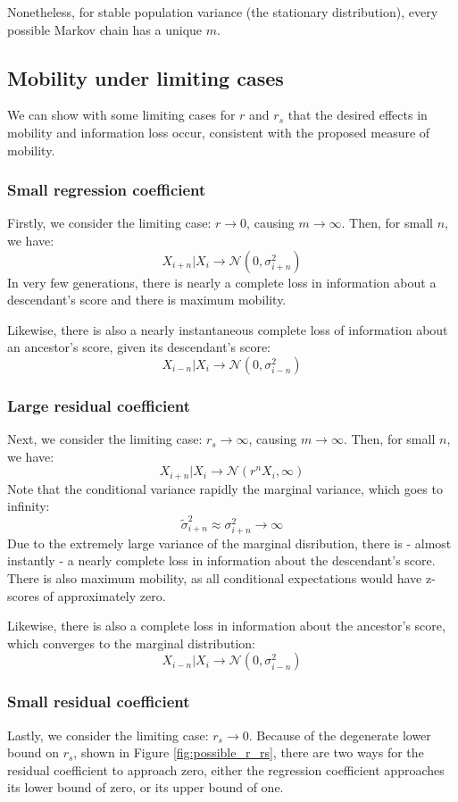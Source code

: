 \documentclass[letterpaper,10pt]{article} %
\begin{document}
Nonetheless, for stable population variance (the stationary distribution), every possible Markov chain has a unique $m$. 

\subsection{Mobility under limiting cases}

We can show with some limiting cases for $r$ and $r_s$ that the desired effects in mobility and information loss occur, consistent with the proposed measure of mobility. 

\subsubsection*{Small regression coefficient}
Firstly, we consider the limiting case: $r \rightarrow 0$, causing $m \rightarrow \infty$. Then, for small $n$, we have:
$$X_{i+n}|X_i \rightarrow \mathcal{N}(0, \sigma_{i+n}^2)$$
In very few generations, there is nearly a complete loss in information about a descendant's score and there is maximum mobility. 

Likewise, there is also a nearly instantaneous complete loss of information about an ancestor's score, given its descendant's score:
$$X_{i-n}|X_i \rightarrow \mathcal{N}(0, \sigma_{i-n}^2)$$


\subsubsection*{Large residual coefficient}
Next, we consider the limiting case: $r_s \rightarrow \infty$, causing $m \rightarrow \infty$. Then, for small $n$, we have:
$$X_{i+n}|X_i \rightarrow \mathcal{N}(r^nX_i, \infty)$$
Note that the conditional variance rapidly the marginal variance, which goes to infinity:
$$ \tilde{\sigma}_{i+n}^2 \approx \sigma_{i+n}^2 \rightarrow \infty$$
Due to the extremely large variance of the marginal disribution, there is - almost instantly - a nearly complete loss in information about the descendant's score. There is also maximum mobility, as all conditional expectations would have z-scores of approximately zero. 

Likewise, there is also a complete loss in information about the ancestor's score, which converges to the marginal distribution:
$$X_{i-n}|X_i \rightarrow \mathcal{N}(0, \sigma_{i-n}^2)$$


\subsubsection*{Small residual coefficient}
Lastly, we consider the limiting case: $r_s \rightarrow 0$. Because of the degenerate lower bound on $r_s$, shown in Figure \ref{fig:possible_r_rs}, there are two ways for the residual coefficient to approach zero, either the regression coefficient approaches its lower bound of zero, or its upper bound of one.
\end{document}
